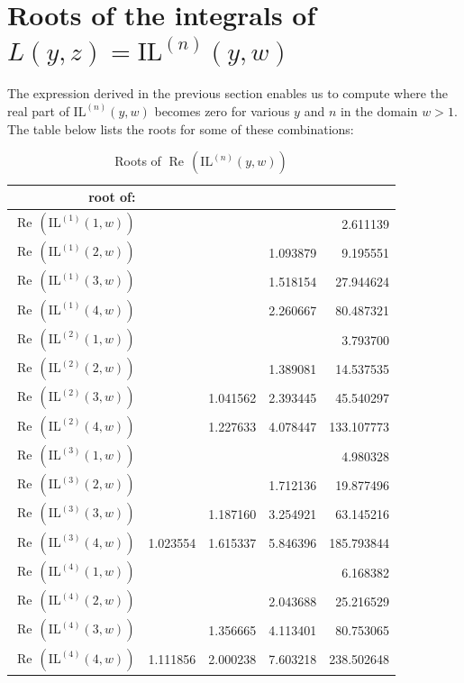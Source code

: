 \documentclass[a4paper,11pt,twoside]{amsart}
\newcommand\IL{\mathrm{IL}}
\renewcommand\Re{{\operatorname{Re\,}}}
\begin{document}
\pagebreak
\section{Roots of the integrals of $L(y,z) = \IL^{(n)}(y,w)$}

The expression derived in the previous section enables us to compute where the real part of $\IL^{(n)}(y,w)$ becomes zero for various $y$ and $n$ in the domain $w > 1$. The table below lists the roots for some of these combinations:

\begin{table}[H]
  \begin{center}
    \begin{tabular}{r|r|r|r|r} %
      root of:      &  &  &  & \\
      	\hline
		$\Re(\IL^{(1)}(1,w))$  &          &          &          &  2.611139 \\
		$\Re(\IL^{(1)}(2,w))$  &          &          & 1.093879 &  9.195551 \\
		$\Re(\IL^{(1)}(3,w))$  &          &          & 1.518154 & 27.944624 \\
		$\Re(\IL^{(1)}(4,w))$  &          &          & 2.260667 & 80.487321 \\
		\hline
		$\Re(\IL^{(2)}(1,w))$  &          &          &          &  3.793700 \\  
		$\Re(\IL^{(2)}(2,w))$  &          &          & 1.389081 & 14.537535 \\
		$\Re(\IL^{(2)}(3,w))$  &          & 1.041562 & 2.393445 & 45.540297 \\
		$\Re(\IL^{(2)}(4,w))$  &          & 1.227633 & 4.078447 &133.107773 \\
		\hline
		$\Re(\IL^{(3)}(1,w))$  &          &          &          &  4.980328 \\
		$\Re(\IL^{(3)}(2,w))$  &          &          & 1.712136 & 19.877496 \\
		$\Re(\IL^{(3)}(3,w))$  &          & 1.187160 & 3.254921 & 63.145216 \\
		$\Re(\IL^{(3)}(4,w))$  & 1.023554 & 1.615337 & 5.846396 &185.793844 \\ 
		\hline
		$\Re(\IL^{(4)}(1,w))$  &          &          &          &  6.168382 \\
		$\Re(\IL^{(4)}(2,w))$  &          &          & 2.043688 & 25.216529 \\
		$\Re(\IL^{(4)}(3,w))$  &          & 1.356665 & 4.113401 & 80.753065 \\
		$\Re(\IL^{(4)}(4,w))$  & 1.111856 & 2.000238 & 7.603218 &238.502648 \\ 
    \end{tabular}
  \end{center}
  \caption{Roots of $\Re(\IL^{(n)}(y,w))$}
\end{table}
\vspace{-2em}
\end{document}
